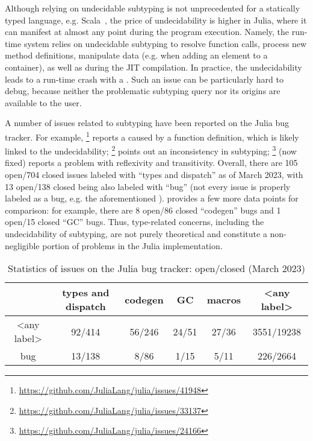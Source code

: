 Although relying on undecidable subtyping is not unprecedented
for a statically typed language, e.g. Scala~\cite{hu:dot-undec:2020},
the price of undecidability
is higher in Julia, where it
can manifest at almost any point during the program execution.
Namely, the run-time system relies on undecidable subtyping
to resolve function calls,
process new method definitions,
manipulate data (e.g. when adding an element to a container),
as well as during the JIT compilation.
In practice, the undecidability
leads to a run-time crash with a .
Such an issue can be particularly hard to debug,
because neither the problematic subtyping query nor its origins are available
to the user.

A number of issues related to subtyping have been reported
on the Julia bug tracker. For example,
\href{https://github.com/JuliaLang/julia/issues/41948}{}\footnote{
    \url{https://github.com/JuliaLang/julia/issues/41948}
} reports a  caused by a function definition,
which is likely linked to the undecidability;
\href{https://github.com/JuliaLang/julia/issues/33137}{}\footnote{
    \url{https://github.com/JuliaLang/julia/issues/33137}
} points out an inconsistency in subtyping; %
\href{https://github.com/JuliaLang/julia/issues/24166}{}\footnote{
    \url{https://github.com/JuliaLang/julia/issues/24166} 
} (now fixed) reports a problem with reflexivity and transitivity.
Overall, there are 105 open/704 closed issues labeled with ``types and
dispatch'' as of March 2023,
with 13 open/138 closed being also labeled with ``bug''
(not every issue is properly labeled as a bug,
e.g. the aforementioned
\href{https://github.com/JuliaLang/julia/issues/24166}{}).
 provides a few more data points for comparison:
for example, there are 8 open/86 closed ``codegen'' bugs
and 1 open/15 closed ``GC'' bugs.
Thus, type-related concerns, including the undecidability of subtyping,
are not purely theoretical and
constitute a non-negligible portion of problems in the Julia implementation.

\begin{table}[t]
\caption{Statistics of issues on the Julia bug tracker: open/closed (March 2023)}\label{tab:julia-issues-stats}
\vspace*{0.25em}
\centering\footnotesize
\begin{tabular}{c|ccccc}
 & types and dispatch & codegen & GC & macros & <any label> \\
\midrule
<any label> &
  92/414 & 56/246 & 24/51 & 27/36 & 3551/19238 \\
bug &
  13/138 & 8/86 & 1/15 & 5/11 & 226/2664
\end{tabular}
\end{table}
